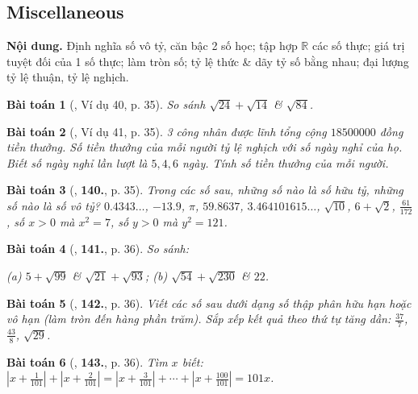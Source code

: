 \documentclass{article}
\newtheorem{baitoan}{Bài toán}
\begin{document}

\subsection{Miscellaneous}
\textsf{\textbf{Nội dung.} Định nghĩa số vô tỷ, căn bậc 2 số học; tập hợp $\mathbb{R}$ các số thực; giá trị tuyệt đối của 1 số thực; làm tròn số; tỷ lệ thức \& dãy tỷ số bằng nhau; đại lượng tỷ lệ thuận, tỷ lệ nghịch.}

\begin{baitoan}[\cite{Tuyen_Toan_7}, Ví dụ 40, p. 35]
	So sánh $\sqrt{24} + \sqrt{14}$ \& $\sqrt{84}$.
\end{baitoan}

\begin{baitoan}[\cite{Tuyen_Toan_7}, Ví dụ 41, p. 35]
	3 công nhân được lĩnh tổng cộng $18 500 000$ đồng tiền thưởng. Số tiền thưởng của mỗi người tỷ lệ nghịch với số ngày nghỉ của họ. Biết số ngày nghỉ lần lượt là $5,4,6$ ngày. Tính số tiền thưởng của mỗi người.
\end{baitoan}

\begin{baitoan}[\cite{Tuyen_Toan_7}, \textbf{140.}, p. 35]
	Trong các số sau, những số nào là số hữu tỷ, những số nào là số vô tỷ? $0.4343\ldots$, $-13.9$, $\pi$, $59.8637$, $3.464101615\ldots$, $\sqrt{10}$, $6 + \sqrt{2}$, $\frac{61}{172}$, số $x > 0$ mà $x^2 = 7$, số $y > 0$ mà $y^2 = 121$.
\end{baitoan}

\begin{baitoan}[\cite{Tuyen_Toan_7}, \textbf{141.}, p. 36]
	So sánh:
	
		(a) $5 + \sqrt{99}$ \& $\sqrt{21} + \sqrt{93}$;
		(b) $\sqrt{54} + \sqrt{230}$ \& $22$.
	
\end{baitoan}

\begin{baitoan}[\cite{Tuyen_Toan_7}, \textbf{142.}, p. 36]
	Viết các số sau dưới dạng số thập phân hữu hạn hoặc vô hạn (làm tròn đến hàng phần trăm). Sắp xếp kết quả theo thứ tự tăng dần: $\frac{37}{7}$, $\frac{43}{8}$, $\sqrt{29}$.
\end{baitoan}

\begin{baitoan}[\cite{Tuyen_Toan_7}, \textbf{143.}, p. 36]
	Tìm $x$ biết: $\left|x + \frac{1}{101}\right| + \left|x + \frac{2}{101}\right| = \left|x + \frac{3}{101}\right| + \cdots + \left|x + \frac{100}{101}\right| = 101x$.
\end{baitoan}
\end{document}
